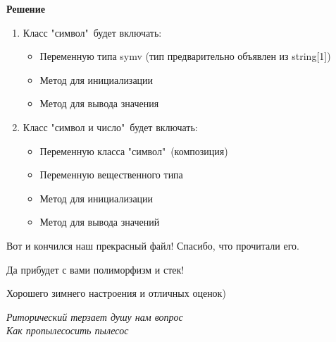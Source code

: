 {\bf Решение}

\begin{enumerate}
\item Класс "символ"\ будет включать:
\begin{itemize}
    \item Переменную типа symv (тип предварительно объявлен из string[1])
    \item Метод для инициализации
    \item Метод для вывода значения
\end{itemize}

\item Класс "символ и число"\ будет включать:
\begin{itemize}
    \item Переменную класса "символ"\ (композиция)
    \item Переменную вещественного типа
    \item Метод для инициализации
    \item Метод для вывода значений
\end{itemize}
\end{enumerate}

{}


{}




\vspace*{250pt}
\noindent\makebox[\linewidth]{\rule{\paperwidth}{0.4pt}}
\vspace*{20pt}
{\begin{myquote2}
\begin{center}
    \bf \begin{small}{
    Вот и кончился наш прекрасный файл! Спасибо, что прочитали его.

    Да прибудет с вами полиморфизм и стек!

    Хорошего зимнего настроения и отличных оценок)

}\end{small}\end{center}
\begin{flushright}
    \textit{Риторический терзает душу нам вопрос\\
    Как пропылесосить пылесос}
    \end{flushright}
\end{myquote2}}

